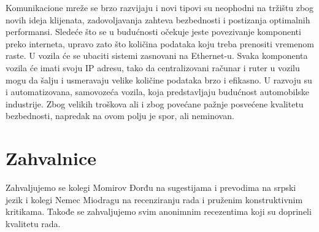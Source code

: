 \documentclass[a4paper]{article}
\begin{document}
Komunikacione mreže se brzo razvijaju i novi tipovi su neophodni na tržištu zbog novih ideja klijenata, zadovoljavanja zahteva bezbednosti i postizanja optimalnih performansi. Sledeće što se u budućnosti očekuje jeste povezivanje komponenti preko interneta, upravo zato što količina podataka koju treba prenositi vremenom raste. U vozila će se ubaciti sistemi zasnovani na Ethernet-u. Svaka komponenta vozila će imati svoju IP adresu, tako da centralizovani računar i ruter u vozilu mogu da šalju i usmeravaju velike količine podataka brzo i efikasno. U razvoju su i automatizovana, samovozeća vozila, koja predstavljaju budućnost automobilske industrije. Zbog velikih troškova ali i zbog povećane pažnje posvećene kvalitetu bezbednosti, napredak na ovom polju je spor, ali neminovan.  

\section{Zahvalnice}

Zahvaljujemo se kolegi Momirov Đorđu na sugestijama i prevodima na srpski jezik i kolegi Nemec Miodragu na recenziranju rada i pruženim konstruktivnim kritikama. Takođe se zahvaljujemo svim anonimnim recezentima koji su doprineli kvalitetu rada. 

\appendix
 

\end{document}
